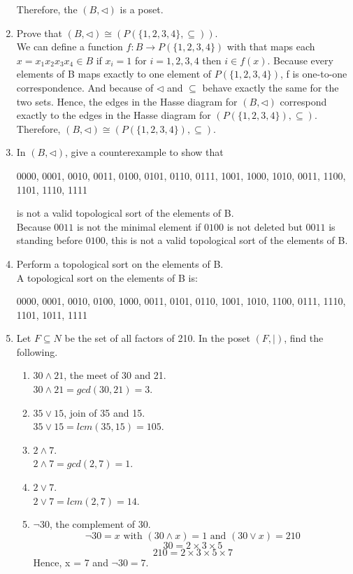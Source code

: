 \documentclass[12pt]{article}
\begin{document}
\begin{enumerate}
  Therefore, the $(B, \triangleleft)$ is a poset.
  \item Prove that $(B, \triangleleft) \cong (P(\{1,2,3,4\}, \subseteq))$.\\
  We can define a function $f: B \to P(\{1,2,3,4\})$ with that maps each $x = x_1x_2x_3x_4 \in B$ if $x_i = 1$ for $i = 1,2,3,4$ then $i \in f(x)$. Because every elements of B maps exactly to one element of $P(\{1,2,3,4\})$, f is one-to-one correspondence. And because of $\triangleleft$ and $\subseteq$ behave exactly the same for the two sets. Hence, the edges in the Hasse diagram for $(B, \triangleleft)$ correspond exactly to the edges in the Hasse diagram for $(P(\{1,2,3,4\}), \subseteq)$. Therefore, $(B, \triangleleft) \cong (P(\{1,2,3,4\}), \subseteq)$.
  \item In $(B, \triangleleft)$, give a counterexample to show that\\
  \begin{center}
    0000, 0001, 0010, 0011, 0100, 0101, 0110, 0111, 1001, 1000, 1010, 0011, 1100, 1101, 1110, 1111
  \end{center}
  is not a valid topological sort of the elements of B.\\
  Because $0011$ is not the minimal element if $0100$ is not deleted but $0011$ is standing before $0100$, this is not a valid topological sort of the elements of B. 
  \item Perform a topological sort on the elements of B.\\
  A topological sort on the elements of B is:
  \begin{center}
    0000, 0001, 0010, 0100, 1000, 0011, 0101, 0110, 1001, 1010, 1100, 0111, 1110, 1101, 1011, 1111
  \end{center}
  \item Let $F \subseteq N$ be the set of all factors of 210. In the poset $(F, |)$, find the following.
  \begin{enumerate}
    \item $30 \wedge 21$, the meet of 30 and 21.\\
    $30 \wedge 21 = gcd(30,21) = 3$.
    \item $35 \vee 15$, join of 35 and 15.\\
    $35 \vee 15 = lcm(35,15) = 105$.
    \item $2 \wedge 7$.\\
    $2 \wedge 7 = gcd(2,7) = 1$.
    \item $2 \vee 7$.\\
    $2 \vee 7 = lcm(2,7) = 14$.
    \item $\neg 30$, the complement of 30.
    \[\neg 30 = x \text{ with } (30 \wedge x) = 1 \text{ and } (30 \vee x) = 210\]
    \[30 = 2\times3\times5\]
    \[210 = 2\times3\times5\times7\]
    Hence, x = 7 and $\neg 30 = 7$.
  \end{enumerate}

\end{enumerate}
\end{document}
